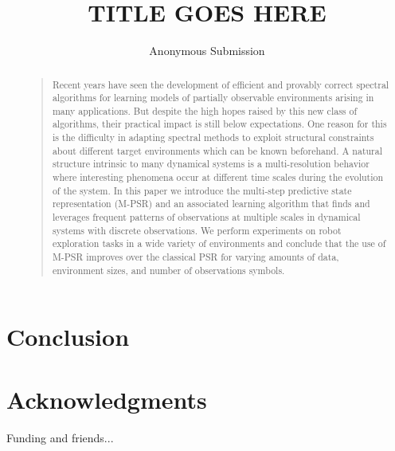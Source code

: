 \documentclass[letterpaper]{article}
\begin{document}
\title{TITLE GOES HERE}
\author{Anonymous Submission}
\maketitle

\begin{abstract}
\begin{quote}
Recent years have seen the development of efficient and provably correct spectral algorithms for learning models of partially observable environments arising in many applications. But despite the high hopes raised by this new class of algorithms, their practical impact is still below expectations. One reason for this is the difficulty in adapting spectral methods to exploit structural constraints about different target environments which can be known beforehand. A natural structure intrinsic to many dynamical systems is a multi-resolution behavior where interesting phenomena occur at different time scales during the evolution of the system. In this paper we introduce the multi-step predictive state representation (M-PSR) and an associated learning algorithm that finds and leverages frequent patterns of observations at multiple scales in dynamical systems with discrete observations. We perform experiments on robot exploration tasks in a wide variety of environments and conclude that the use of M-PSR improves over the classical PSR for varying amounts of data, environment sizes, and number of observations symbols.

\end{quote}
\end{abstract}






\section{Conclusion}

\section{Acknowledgments}
Funding and friends...



\end{document}
